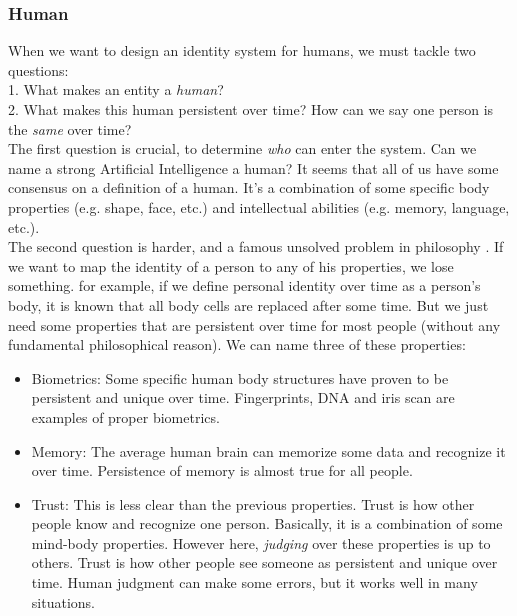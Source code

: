 \documentclass[conference]{IEEEtran}
\begin{document}
\subsubsection{Human}
When we want to design an identity system for humans, we must tackle two questions:
\\
1. What makes an entity a \textit{human}?
\\
2. What makes this human persistent over time? How can we say one person is the \textit{same} over time?
\\
The first question is crucial, to determine \textit{who} can enter the system. Can we name a strong Artificial Intelligence a human? It seems that all of us have some consensus on a definition of a human. It's a combination of some specific body properties (e.g. shape, face, etc.) and intellectual abilities (e.g. memory, language, etc.). 
\\
The second question is harder, and a famous unsolved problem in philosophy \cite{identity-personal}. If we want to map the identity of a person to any of his properties, we lose something. for example, if we define personal identity over time as a person's body, it is known that all body cells are replaced after some time. But we just need some properties that are persistent over time for most people (without any fundamental philosophical reason). We can name three of these properties: 
\begin{itemize}
\item{Biometrics:}
Some specific human body structures have proven to be persistent and unique over time. Fingerprints, DNA and iris scan are examples of proper biometrics.
\item{Memory:}
The average human brain can memorize some data and recognize it over time. Persistence of memory is almost true for all people.
\item{Trust:}
This is less clear than the previous properties. Trust is how other people know and recognize one person. Basically, it is a combination of some mind-body properties. However here, \textit{judging} over these properties is up to others. Trust is how other people see someone as persistent and unique over time. Human judgment can make some errors, but it works well in many situations.
\end{itemize}
\end{document}
